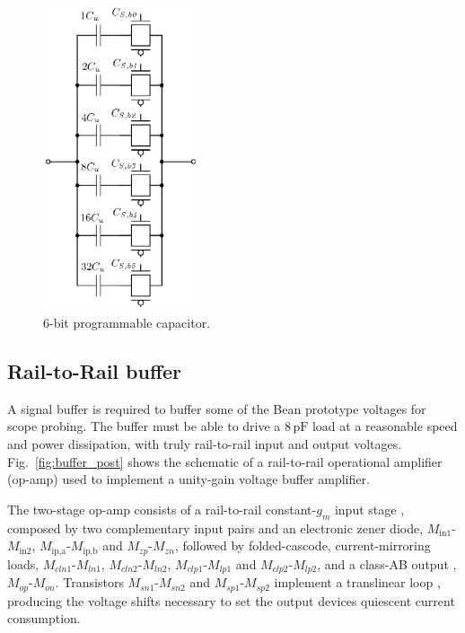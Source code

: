 \begin{figure}[!t]
	\centering
	\includegraphics[width=1.8in]{./Figures/Filter/cap_array_post.eps}
	\caption{6-bit programmable capacitor.}\label{fig:cap_array_post}
\end{figure}

\subsection{Rail-to-Rail buffer}
A signal buffer is required to buffer some of the Bean prototype voltages for scope probing. The buffer must be able to drive a $8\,\text{pF}$ load at a reasonable speed and power dissipation, with truly rail-to-rail input and output voltages. Fig.~\ref{fig:buffer_post} shows the schematic of a rail-to-rail operational amplifier (op-amp) used to implement a unity-gain voltage buffer amplifier.

The two-stage op-amp consists of a rail-to-rail constant-$g_m$ input stage \citep{hogervorst101}, composed by two complementary input pairs and an electronic zener diode, $M_\text{in1}$-$M_\text{in2}$, $M_\text{ip,a}$-$M_\text{ip,b}$ and $M_\textit{zp}$-$M_\textit{zn}$,  followed by folded-cascode, current-mirroring loads, \mbox{$M_\textit{cln1}$-$M_\textit{ln1}$}, $M_\textit{cln2}$-$M_\textit{ln2}$, $M_\textit{clp1}$-$M_\textit{lp1}$ and $M_\textit{clp2}$-$M_\textit{lp2}$, and a class-AB output \citep{hogervorst102}, $M_\textit{op}$-$M_\textit{on}$. Transistors $M_\textit{sn1}$-$M_\textit{sn2}$ and $M_\textit{sp1}$-$M_\textit{sp2}$ implement a translinear loop \citep{analogessentials}, producing the voltage shifts necessary to set the output devices quiescent current consumption.

